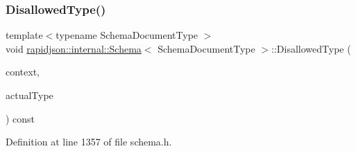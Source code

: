 \mbox{\label{classrapidjson_1_1internal_1_1_schema_af83b48bf2e3899dc90c8d20253bd49c5}} 
\subsubsection{\texorpdfstring{DisallowedType()}{DisallowedType()}}
{\footnotesize\ttfamily template$<$typename Schema\+Document\+Type $>$ \\
void \mbox{\hyperlink{classrapidjson_1_1internal_1_1_schema}{rapidjson\+::internal\+::\+Schema}}$<$ Schema\+Document\+Type $>$\+::Disallowed\+Type (\begin{DoxyParamCaption}\item[{\mbox{\hyperlink{classrapidjson_1_1internal_1_1_schema_afca06b1f51d1bc18403bdf3f4d55ffef}{Context}} \&}]{context,  }\item[{const \mbox{\hyperlink{classrapidjson_1_1internal_1_1_schema_a3979a9083c598195927c08c6e3ba91d1}{Value\+Type}} \&}]{actual\+Type }\end{DoxyParamCaption}) const\hspace{0.3cm}{\ttfamily [private]}}



Definition at line 1357 of file schema.\+h.



